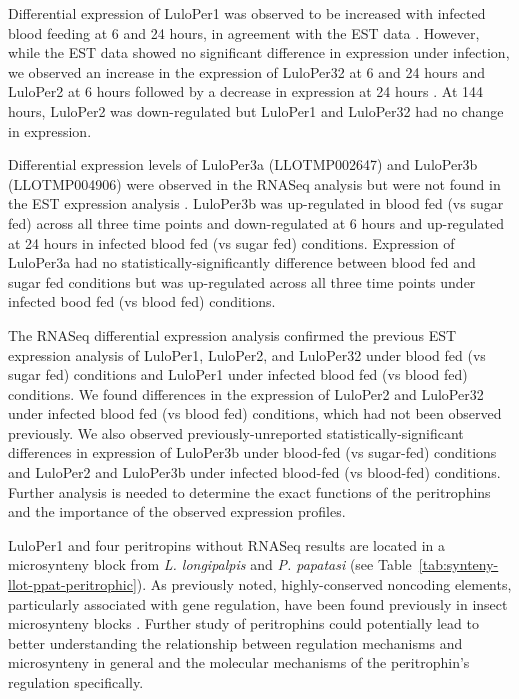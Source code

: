 Differential expression of LuloPer1 was observed to be increased with infected blood feeding at 6 and 24 hours, in agreement with the EST data \cite{Jochim2008,Dostalova2012}.  However, while the EST data showed no significant difference in expression under infection, we observed an increase in the expression of LuloPer32 at 6 and 24 hours and LuloPer2 at 6 hours followed by a decrease in expression at 24 hours \cite{Jochim2008}.  At 144 hours, LuloPer2 was down-regulated but LuloPer1 and LuloPer32 had no change in expression.

Differential expression levels of LuloPer3a (LLOTMP002647) and LuloPer3b (LLOTMP004906) were observed in the RNASeq analysis but were not found in the EST expression analysis \cite{Jochim2008}. LuloPer3b was up-regulated in blood fed (vs sugar fed) across all three time points and down-regulated at 6 hours and up-regulated at 24 hours in infected blood fed (vs sugar fed) conditions.  Expression of LuloPer3a had no statistically-significantly difference between blood fed and sugar fed conditions but was up-regulated across all three time points under infected bood fed (vs blood fed) conditions.

The RNASeq differential expression analysis confirmed the previous EST expression analysis of LuloPer1, LuloPer2, and LuloPer32 under blood fed (vs sugar fed) conditions and LuloPer1 under infected blood fed (vs blood fed) conditions.  We found differences in the expression of LuloPer2 and LuloPer32 under infected blood fed (vs blood fed) conditions, which had not been observed previously.  We also observed previously-unreported statistically-significant differences in expression of LuloPer3b under blood-fed (vs sugar-fed) conditions and LuloPer2 and LuloPer3b under infected blood-fed (vs blood-fed) conditions. Further analysis is needed to determine the exact functions of the peritrophins and the importance of the observed expression profiles.

LuloPer1 and four peritropins without RNASeq results are located in a microsynteny block from \emph{L. longipalpis} and \emph{P. papatasi} (see Table~\ref{tab:synteny-llot-ppat-peritrophic}). As previously noted, highly-conserved noncoding elements, particularly associated with gene regulation, have been found previously in insect microsynteny blocks \cite{Engstrom2007}.  Further study of peritrophins could potentially lead to  better understanding the relationship between regulation mechanisms and microsynteny in general and the molecular mechanisms of the peritrophin's regulation specifically.

